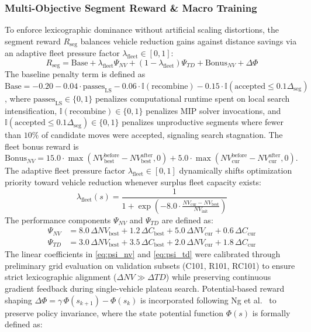 \documentclass{ieeeaccess}
\begin{document}
\subsubsection{Multi-Objective Segment Reward \& Macro Training}
To enforce lexicographic dominance without artificial scaling distortions, the segment reward $R_{\text{seg}}$ balances vehicle reduction gains against distance savings via an adaptive fleet pressure factor $\lambda_{\text{fleet}} \in [0, 1]$:
\begin{equation}
  R_{\text{seg}} = \text{Base} + \lambda_{\text{fleet}} \Psi_{NV} + (1 - \lambda_{\text{fleet}}) \Psi_{TD} + \text{Bonus}_{NV} + \Delta \Phi
  \label{eq:segment_reward}
\end{equation}
The baseline penalty term is defined as $\text{Base} = -0.20 - 0.04 \cdot \text{passes}_{\text{LS}} - 0.06 \cdot \mathbb{I}(\text{recombine}) - 0.15 \cdot \mathbb{I}(\text{accepted} \le 0.1 \Delta_{\text{seg}})$, where $\text{passes}_{\text{LS}} \in \{0, 1\}$ penalizes computational runtime spent on local search intensification, $\mathbb{I}(\text{recombine}) \in \{0, 1\}$ penalizes MIP solver invocations, and $\mathbb{I}(\text{accepted} \le 0.1 \Delta_{\text{seg}}) \in \{0, 1\}$ penalizes unproductive segments where fewer than $10\%$ of candidate moves were accepted, signaling search stagnation. The fleet bonus reward is $\text{Bonus}_{NV} = 15.0 \cdot \max(NV_{\text{best}}^{\text{before}} - NV_{\text{best}}^{\text{after}}, 0) + 5.0 \cdot \max(NV_{\text{cur}}^{\text{before}} - NV_{\text{cur}}^{\text{after}}, 0)$. The adaptive fleet pressure factor $\lambda_{\text{fleet}} \in [0, 1]$ dynamically shifts optimization priority toward vehicle reduction whenever surplus fleet capacity exists:
\begin{equation}
  \lambda_{\text{fleet}}(s) = \frac{1}{1 + \exp\left(-8.0 \cdot \frac{NV_{\text{cur}} - NV_{\text{best}}}{NV_{\text{init}}}\right)}
  \label{eq:lambda_fleet}
\end{equation}
The performance components $\Psi_{NV}$ and $\Psi_{TD}$ are defined as:
\begin{align}
  \Psi_{NV} &= 8.0\,\Delta NV_{\text{best}} + 1.2\,\Delta C_{\text{best}} + 5.0\,\Delta NV_{\text{cur}} + 0.6\,\Delta C_{\text{cur}} \label{eq:psi_nv} \\
  \Psi_{TD} &= 3.0\,\Delta NV_{\text{best}} + 3.5\,\Delta C_{\text{best}} + 2.0\,\Delta NV_{\text{cur}} + 1.8\,\Delta C_{\text{cur}} \label{eq:psi_td}
\end{align}
The linear coefficients in \eqref{eq:psi_nv} and \eqref{eq:psi_td} were calibrated through preliminary grid evaluation on validation subsets (C101, R101, RC101) to ensure strict lexicographic alignment ($\Delta NV \gg \Delta TD$) while preserving continuous gradient feedback during single-vehicle plateau search. Potential-based reward shaping $\Delta \Phi = \gamma\,\Phi(s_{k+1}) - \Phi(s_k)$ is incorporated following Ng et al.\ \cite{ng1999policy} to preserve policy invariance, where the state potential function $\Phi(s)$ is formally defined as:
\end{document}
